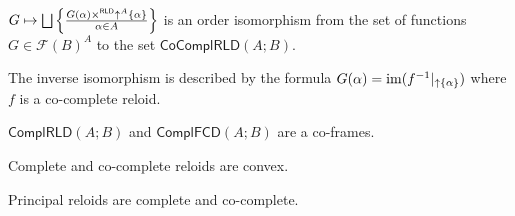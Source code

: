 \begin{cor}
$G\mapsto\bigsqcup\left\{ \frac{G(\alpha)\times^{\mathsf{RLD}}\uparrow^{A}\{\alpha\}}{\alpha\in A}\right\}$
is an order isomorphism from the set of functions $G\in\mathscr{F}(B)^{A}$
to the set $\mathsf{CoComplRLD}(A;B)$.

The inverse isomorphism is described by the formula $G(\alpha)=\operatorname{im}(f^{-1}|_{\uparrow\{\alpha\}})$
where $f$ is a co-complete reloid.
\end{cor}

\begin{cor}
$\mathsf{ComplRLD}(A;B)$ and $\mathsf{ComplFCD}(A;B)$ are a co-frames.\end{cor}
\begin{obvious}
Complete and co-complete reloids are convex.
\end{obvious}

\begin{obvious}
Principal reloids are complete and co-complete.
\end{obvious}

